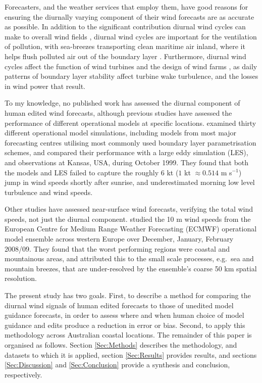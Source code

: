 \documentclass{ametsoc}
\begin{document}
Forecasters, and the weather services that employ them, have good reasons for ensuring the diurnally varying component of their wind forecasts are as accurate as possible. In addition to the significant contribution diurnal wind cycles can make to overall wind fields \citep[e.g.][]{dai99}, diurnal wind cycles are important for the ventilation of pollution, with sea-breezes transporting clean maritime air inland, where it helps flush polluted air out of the boundary layer \citep{miller03, physick92}. Furthermore, diurnal wind cycles affect the function of wind turbines \citep{englberger18} and the design of wind farms \citep{abkar16}, as daily patterns of boundary layer stability affect turbine wake turbulence, and the losses in wind power that result.

To my knowledge, no published work has assessed the diurnal component of human edited wind forecasts, although previous studies have assessed the performance of different operational models at specific locations. \citet{svensson11} examined thirty different operational model simulations, including models from most major forecasting centres utilising most commonly used boundary layer parametrisation schemes, and compared their performance with a large eddy simulation (LES), and observations at Kansas, USA, during October 1999. They found that both the models and LES failed to capture the roughly $6$ kt ($1$ kt $\approx 0.514$ m s$^{-1}$) jump in wind speeds shortly after sunrise, and underestimated morning low level turbulence and wind speeds.

Other studies have assessed near-surface wind forecasts, verifying the total wind speeds, not just the diurnal component. \citet{pinson12} studied the 10 m wind speeds from the European Centre for Medium Range Weather Forecasting (ECMWF) operational model ensemble across western Europe over December, January, February 2008/09. They found that the worst performing regions were coastal and mountainous areas, and attributed this to the small scale processes, e.g.~sea and mountain breezes, that are under-resolved by the ensemble's coarse 50 km spatial resolution.

The present study has two goals. First, to describe a method for comparing the diurnal wind signals of human edited forecasts to those of unedited model guidance forecasts, in order to assess where and when human choice of model guidance and edits produce a reduction in error or bias. Second, to apply this methodology across Australian coastal locations. The remainder of this paper is organised as follows. Section \ref{Sec:Methods} describes the methodology, and datasets to which it is applied, section \ref{Sec:Results} provides results, and sections \ref{Sec:Discussion} and \ref{Sec:Conclusion} provide a synthesis and conclusion, respectively.
\end{document}
